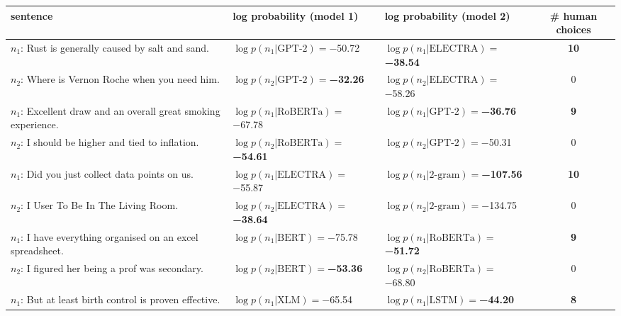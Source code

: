 \begin{tabularx}{\textwidth}{lllc}
\toprule
                                                             sentence &                               log probability (model 1) &                               log probability (model 2) &   \# human choices \\
\midrule
                    $n_1$: Rust is generally caused by salt and sand. &             $\log p(n_1 | \textrm{GPT-2})=$\num{-50.72} &  $\log p(n_1 | \textrm{ELECTRA})=$\textbf{\num{-38.54}} &  \textbf{\num{10}} \\
                      $n_2$: Where is Vernon Roche when you need him. &    $\log p(n_2 | \textrm{GPT-2})=$\textbf{\num{-32.26}} &           $\log p(n_2 | \textrm{ELECTRA})=$\num{-58.26} &            \num{0} \\\midrule
       $n_1$: Excellent draw and an overall great smoking experience. &           $\log p(n_1 | \textrm{RoBERTa})=$\num{-67.78} &    $\log p(n_1 | \textrm{GPT-2})=$\textbf{\num{-36.76}} &   \textbf{\num{9}} \\
                     $n_2$: I should be higher and tied to inflation. &  $\log p(n_2 | \textrm{RoBERTa})=$\textbf{\num{-54.61}} &             $\log p(n_2 | \textrm{GPT-2})=$\num{-50.31} &            \num{0} \\\midrule
                       $n_1$: Did you just collect data points on us. &           $\log p(n_1 | \textrm{ELECTRA})=$\num{-55.87} &  $\log p(n_1 | \textrm{2-gram})=$\textbf{\num{-107.56}} &  \textbf{\num{10}} \\
                              $n_2$: I User To Be In The Living Room. &  $\log p(n_2 | \textrm{ELECTRA})=$\textbf{\num{-38.64}} &           $\log p(n_2 | \textrm{2-gram})=$\num{-134.75} &            \num{0} \\\midrule
          $n_1$: I have everything organised on an excel spreadsheet. &              $\log p(n_1 | \textrm{BERT})=$\num{-75.78} &  $\log p(n_1 | \textrm{RoBERTa})=$\textbf{\num{-51.72}} &   \textbf{\num{9}} \\
                     $n_2$: I figured her being a prof was secondary. &     $\log p(n_2 | \textrm{BERT})=$\textbf{\num{-53.36}} &           $\log p(n_2 | \textrm{RoBERTa})=$\num{-68.80} &            \num{0} \\\midrule
               $n_1$: But at least birth control is proven effective. &               $\log p(n_1 | \textrm{XLM})=$\num{-65.54} &     $\log p(n_1 | \textrm{LSTM})=$\textbf{\num{-44.20}} &   \textbf{\num{8}} \\

\end{tabularx}
